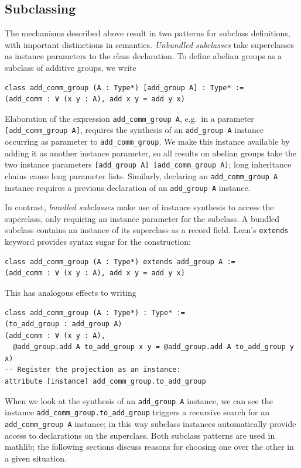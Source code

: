 \documentclass[a4paper,UKenglish,cleveref, autoref, thm-restate]{lipics-v2021}
\newcommand{\mathlib}{\textsf{mathlib}\xspace}
\begin{document}
\subsection{Subclassing}
The mechanisms described above result in two patterns for subclass definitions, with important distinctions in semantics.
\emph{Unbundled subclasses} take superclasses as instance parameters to the class declaration.
To define abelian groups as a subclass of additive groups, we write
\begin{lstlisting}
class add_comm_group (A : Type*) [add_group A] : Type* :=
(add_comm : ∀ (x y : A), add x y = add y x)
\end{lstlisting}
Elaboration of the expression \lstinline{add_comm_group A}, e.g.~in a parameter \mbox{\lstinline{[add_comm_group A]}},
requires the synthesis of an \lstinline{add_group A} instance occurring as parameter to \lstinline{add_comm_group}.
We make this instance available by adding it as another instance parameter,
so all results on abelian groups take the two instance parameters \lstinline{[add_group A] [add_comm_group A]};
long inheritance chains cause long parameter lists.
Similarly, declaring an \lstinline{add_comm_group A} instance requires a previous declaration of an \lstinline{add_group A} instance.

In contrast, \emph{bundled subclasses} make use of instance synthesis to access the superclass, only requiring an instance parameter for the subclass.
A bundled subclass contains an instance of its superclass as a record field.
Lean's \lstinline{extends} keyword provides syntax sugar for the construction:
\begin{lstlisting}
class add_comm_group (A : Type*) extends add_group A :=
(add_comm : ∀ (x y : A), add x y = add y x)
\end{lstlisting}
This has analogous effects to writing
\begin{lstlisting}
class add_comm_group (A : Type*) : Type* :=
(to_add_group : add_group A)
(add_comm : ∀ (x y : A),
  @add_group.add A to_add_group x y = @add_group.add A to_add_group y x)
-- Register the projection as an instance:
attribute [instance] add_comm_group.to_add_group
\end{lstlisting}
When we look at the synthesis of an \lstinline{add_group A} instance, we can see the instance \lstinline{add_comm_group.to_add_group} triggers a recursive search for an \lstinline{add_comm_group A} instance;
in this way subclass instances automatically provide access to declarations on the superclass.
Both subclass patterns are used in \mathlib; the following sections discuss reasons for choosing one over the other in a given situation.
\end{document}
